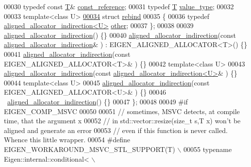 \begin{DoxyCode}
00030     \textcolor{keyword}{typedef} \textcolor{keyword}{const} \hyperlink{group___sparse_core___module}{T}&        \hyperlink{group___sparse_core___module}{const\_reference};
00031     \textcolor{keyword}{typedef} \hyperlink{group___sparse_core___module}{T}               \hyperlink{group___sparse_core___module}{value\_type};
00032 
00033     \textcolor{keyword}{template}<\textcolor{keyword}{class} U>
\hyperlink{struct_eigen_1_1aligned__allocator__indirection_1_1rebind}{00034}     \textcolor{keyword}{struct }\hyperlink{struct_eigen_1_1aligned__allocator__indirection_1_1rebind}{rebind}
00035     \{
00036       \textcolor{keyword}{typedef} \hyperlink{class_eigen_1_1aligned__allocator__indirection}{aligned\_allocator\_indirection<U>} 
      \hyperlink{class_eigen_1_1aligned__allocator__indirection}{other};
00037     \};
00038 
00039     \hyperlink{class_eigen_1_1aligned__allocator__indirection}{aligned\_allocator\_indirection}() \{\}
00040     \hyperlink{class_eigen_1_1aligned__allocator__indirection}{aligned\_allocator\_indirection}(\textcolor{keyword}{const} 
      \hyperlink{class_eigen_1_1aligned__allocator__indirection}{aligned\_allocator\_indirection}& ) : EIGEN\_ALIGNED\_ALLOCATOR<T>() \{\}
00041     \hyperlink{class_eigen_1_1aligned__allocator__indirection}{aligned\_allocator\_indirection}(\textcolor{keyword}{const} EIGEN\_ALIGNED\_ALLOCATOR<T>& ) \{\}
00042     \textcolor{keyword}{template}<\textcolor{keyword}{class} U>
00043     \hyperlink{class_eigen_1_1aligned__allocator__indirection}{aligned\_allocator\_indirection}(\textcolor{keyword}{const} 
      \hyperlink{class_eigen_1_1aligned__allocator__indirection}{aligned\_allocator\_indirection<U>}& ) \{\}
00044     \textcolor{keyword}{template}<\textcolor{keyword}{class} U>
00045     \hyperlink{class_eigen_1_1aligned__allocator__indirection}{aligned\_allocator\_indirection}(\textcolor{keyword}{const} EIGEN\_ALIGNED\_ALLOCATOR<U>& ) \{\}
00046     ~\hyperlink{class_eigen_1_1aligned__allocator__indirection}{aligned\_allocator\_indirection}() \{\}
00047   \};
00048 
00049 \textcolor{preprocessor}{#if EIGEN\_COMP\_MSVC}
00050 
00051   \textcolor{comment}{// sometimes, MSVC detects, at compile time, that the argument x}
00052   \textcolor{comment}{// in std::vector::resize(size\_t s,T x) won't be aligned and generate an error}
00053   \textcolor{comment}{// even if this function is never called. Whence this little wrapper.}
00054 \textcolor{preprocessor}{#define EIGEN\_WORKAROUND\_MSVC\_STL\_SUPPORT(T) \(\backslash\)}
00055 \textcolor{preprocessor}{  typename Eigen::internal::conditional< \(\backslash\)}

\end{DoxyCode}

